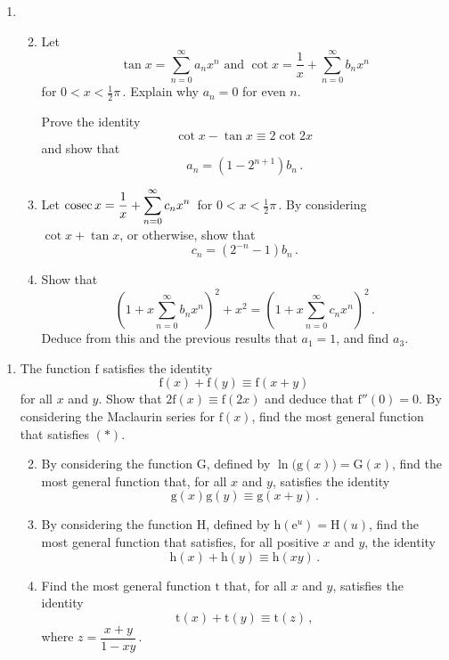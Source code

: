 \documentclass[a4, 11pt]{report}
\newlength{\qspace}
\newcounter{qnumber}
\newenvironment{question}%
 {\vspace{\qspace}
  \begin{enumerate}[\bfseries 1\quad][10]%
    \setcounter{enumi}{\value{qnumber}}%
    \item%
 }
{
  \end{enumerate}
  \filbreak
  \stepcounter{qnumber}
 }
\newenvironment{questionparts}[1][1]%
 {
  \begin{enumerate}[\bfseries (i)]%
    \setcounter{enumii}{#1}
    \addtocounter{enumii}{-1}
    \setlength{\itemsep}{5mm}
    \setlength{\parskip}{8pt}
 }
 {
  \end{enumerate}
 }
\def\e{{\mathrm e}}
\def\g{{\mathrm g}}
\def\h{{\mathrm h}}
\def\f{{\mathrm f}}
\def\t{{\mathrm t}}
\def\G{{\mathrm G}}
\def\H{{\mathrm H}}
\begin{document}
\begin{question}
\begin{questionparts}
\item
Let 
\[
\tan x = \sum\limits_{n=0}^\infty a_n x^n
\text{ \ \ \ and \ \ \ }
\cot x = \dfrac 1 x +\sum\limits_{n=0}^\infty b_nx^n
\]
for $0<x<\frac12\pi\,$. Explain why $a_n=0$ for even $n$.

Prove  the identity
\[
\cot x - \tan x \equiv 2 \cot 2x\,
\]
and show that \[a_{n} = (1-2^{n+1})b_n\,.\]

\item
Let 
$ \displaystyle {\rm cosec}\, x 
= \frac1x +\sum\limits _{n=0}^\infty c_n x^n\,$ for 
$0<x<\frac12\pi\,$.
By considering $\cot x + \tan x$, or otherwise, show that
\[
c_n = (2^{-n} -1)b_n
\,.
\]

\item Show that 
\[
\left(1+x{ \sum\limits_{n=0}^\infty} b_n x^n \right)^2 +x^2
= \left(1+x{ \sum\limits_{n=0} ^\infty} c_n x^n \right)^2\,.
\]
Deduce from this and the previous results that $a_1=1$, and find $a_3$. 
\end{questionparts}
\end{question}

\begin{question}
The function $\f$ satisfies the identity
\begin{equation}
\f(x) +\f(y) \equiv \f(x+y) 
\tag{$*$}
\end{equation}
for all $x$ and $y$. Show that $2\f(x)\equiv \f(2x)$ and deduce that 
$\f''(0)=0$.
By considering the Maclaurin series for $\f(x)$, find the
most general function that satisfies $(*)$.

\begin{questionparts}
\item
By considering the function $\G$, defined by
$\ln\big(\g(x)\big) =\G(x)$, find the 
most general function that, for all $x$ and $y$, satisfies the identity
\[
\g(x) \g(y) \equiv \g(x+y)\,.
\]


\item
By considering the function $\H$, defined by
$\h(\e^u) =\H(u)$, find the 
most general function that satisfies, for all positive $x$ and $y$, the identity
\[
\h(x) +\h(y) \equiv  \h(xy)
\,.
\]

\item Find the most general function $\t$ that, for all $x$ and $y$,
 satisfies the identity
\begin{equation*}
\t(x) + \t(y) \equiv \t(z)\,,
\end{equation*}
where $z= \dfrac{x+y}{1-xy}\,$.


\end{questionparts}
\end{question}
\end{document}
